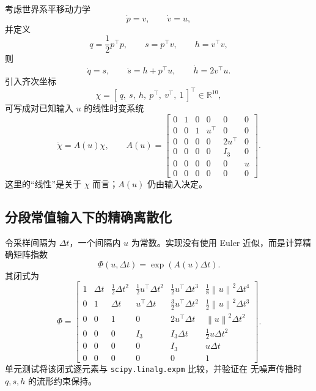 \documentclass[11pt,a4paper]{ctexart}
\newcommand{\norm}[1]{\left\lVert #1\right\rVert}
\newcommand{\R}{\mathbb{R}}
\begin{document}
考虑世界系平移动力学
\begin{equation}
 \dot p=v,\qquad \dot v=u ,
\end{equation}
并定义
\begin{equation}
 q=\frac12p^\top p,\qquad s=p^\top v,\qquad h=v^\top v,
\end{equation}
则
\begin{equation}
 \dot q=s,\qquad
 \dot s=h+p^\top u,\qquad
 \dot h=2v^\top u.
\end{equation}
引入齐次坐标
\begin{equation}
 \chi=
 [\,q,\ s,\ h,\ p^\top,\ v^\top,\ 1\,]^\top\in\R^{10},
\end{equation}
可写成对已知输入 $u$ 的线性时变系统
\begin{equation}
\dot\chi=A(u)\chi,\qquad
A(u)=
\left[
\begin{array}{ccc|c|c|c}
0&1&0&0&0&0\\
0&0&1&u^\top&0&0\\
0&0&0&0&2u^\top&0\\ \hline
0&0&0&0&I_3&0\\ \hline
0&0&0&0&0&u\\ \hline
0&0&0&0&0&0
\end{array}
\right].
\label{eq:continuous-lift}
\end{equation}
这里的“线性”是关于 $\chi$ 而言；$A(u)$ 仍由输入决定。

\subsection{分段常值输入下的精确离散化}

令采样间隔为 $\Delta t$，一个间隔内 $u$ 为常数。实现没有使用
Euler 近似，而是计算精确矩阵指数
\begin{equation}
\Phi(u,\Delta t)=\exp\!\left(A(u)\Delta t\right).
\end{equation}
其闭式为
{\scriptsize
\begin{equation}
\Phi=
\left[
\begin{array}{ccc|c|c|c}
1&\Delta t&\frac12\Delta t^2&
\frac12u^\top\Delta t^2&\frac12u^\top\Delta t^3&
\frac18\norm{u}^2\Delta t^4\\
0&1&\Delta t&u^\top\Delta t&
\frac32u^\top\Delta t^2&\frac12\norm{u}^2\Delta t^3\\
0&0&1&0&2u^\top\Delta t&\norm{u}^2\Delta t^2\\ \hline
0&0&0&I_3&I_3\Delta t&\frac12u\Delta t^2\\ \hline
0&0&0&0&I_3&u\Delta t\\ \hline
0&0&0&0&0&1
\end{array}
\right].
\label{eq:exact-transition}
\end{equation}
}
单元测试将该闭式逐元素与 \texttt{scipy.linalg.expm} 比较，并验证在
无噪声传播时 $q,s,h$ 的流形约束保持。
\end{document}
